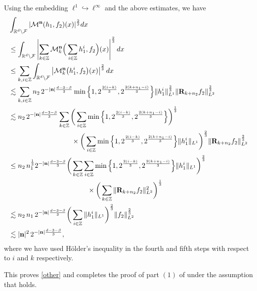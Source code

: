 \documentclass[a4paper,reqno]{amsart}
\newcounter{old}
\numberwithin{equation}{section}
\newcommand{\Z}{{\mathbb Z}}
\begin{document}
	Using the embedding $\ell^1\hookrightarrow\ell^\infty$ and the above estimates, we have
	\begin{align*}
		&\int_{\mathbb{R}^d\setminus \mathcal{F}}|\mathcal{M}^{\mathbf{n}}(h_1,f_2)(x)|^{\frac{2}{3}}dx\\
		&\leq \int_{\mathbb{R}^d\setminus \mathcal{F}}\left|\sum_{k\in\Z}\mathcal{M}^{\mathbf{n}}_k\Big(\sum_{i\in\Z}h_1^{i},f_2\Big)(x)\right|^{\frac{2}{3}}dx\\
		&\leq \sum_{k,i\in\Z}\int_{\mathbb{R}^d\setminus \mathcal{F}}\left|\mathcal{M}^{\mathbf{n}}_k\big(h_1^{i},f_2\big)(x)\right|^{\frac{2}{3}}dx\\
		&\lesssim \sum_{k,i\in\Z}n_2\,2^{-|\mathbf{n}|\frac{d-3-\beta}{3}}\min\Big\{1,2^{\frac{2(i-k)}{3}},2^{\frac{2(k+n_1-i)}{3}}\Big\}\Vert h^{i}_{1}\Vert^{\frac{2}{3}}_{L^{1}}\Vert \mathbf{R}_{k+n_2}f_{2}\Vert^{\frac{2}{3}}_{L^{2}}\\
		&\lesssim n_2\,2^{-|\mathbf{n}|\frac{d-3-\beta}{3}}\sum_{k\in\Z}\bigg(\sum_{i\in\Z}\min\Big\{1,2^{\frac{2(i-k)}{3}},2^{\frac{2(k+n_1-i)}{3}}\Big\}\bigg)^{\frac{1}{3}}\\
		&\hspace{3.2 cm}\times\bigg(\sum_{i\in\Z}\min\Big\{1,2^{\frac{2(i-k)}{3}},2^{\frac{2(k+n_1-i)}{3}}\Big\}\Vert h^{i}_{1}\Vert_{L^{1}}\bigg)^{\frac{2}{3}}\Vert \mathbf{R}_{k+n_2}f_{2}\Vert^{\frac{2}{3}}_{L^{2}}\\
		&\leq n_2\,n_1^{\frac{1}{3}}2^{-|\mathbf{n}|\frac{d-3-\beta}{3}}\bigg(\sum_{k\in\Z}\sum_{i\in\Z}\min\Big\{1,2^{\frac{2(i-k)}{3}},2^{\frac{2(k+n_1-i)}{3}}\Big\}\Vert h^{i}_{1}\Vert_{L^{1}}\bigg)^{\frac{2}{3}}\\
		&\hspace{4cm}\times\bigg(\sum_{k\in\Z}\Vert \mathbf{R}_{k+n_2}f_{2}\Vert^2_{L^{2}}\bigg)^{\frac{1}{3}}\\
		&\lesssim n_2\,n_1\,2^{-|\mathbf{n}|\frac{d-3-\beta}{3}}\bigg(\sum_{i\in\Z}\Vert h^{i}_{1}\Vert_{L^{1}}\bigg)^{\frac{2}{3}}\Vert f_{2}\Vert_{L^{2}}^{\frac{2}{3}}\\
		&\lesssim |\mathbf{n}|^2\,2^{-|\mathbf{n}|\frac{d-3-\beta}{3}},
	\end{align*}
	where we have used H\"older's inequality in the fourth and fifth steps with respect to $i$ and $k$ respectively.
	
	This proves \eqref{other} and completes the proof of part $(1)$ of  under the assumption that  holds.
\end{document}

